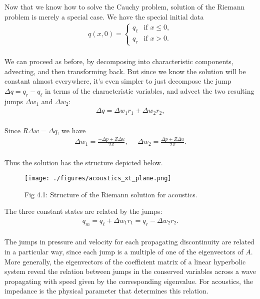 \documentclass{SIAMbook2016}
\makeatletter
\def\maxwidth{\ifdim\Gin@nat@width>\linewidth\linewidth
    \else\Gin@nat@width\fi}
\let\Oldincludegraphics\includegraphics
\renewcommand{\includegraphics}[1]{\Oldincludegraphics[width=.8\maxwidth]{#1}}
\makeatother
\begin{document}
Now that we know how to solve the Cauchy problem, solution of the
Riemann problem is merely a special case. We have the special initial
data\\
\begin{align*}
q(x,0) = \begin{cases}
q_\ell & \text{if   } x \le 0, \\
q_r & \text{if   } x > 0.
\end{cases}
\end{align*}\\
We can proceed as before, by decomposing into characteristic components,
advecting, and then transforming back. But since we know the solution
will be constant almost everywhere, it's even simpler to just decompose
the jump \(\Delta q = q_r - q_\ell\) in terms of the characteristic
variables, and advect the two resulting jumps \(\Delta w_1\) and
\(\Delta w_2\):\\
\begin{align*}
\Delta q = \Delta w_1 r_1 + \Delta w_2 r_2,
\end{align*}\\
Since \(R\Delta w = \Delta q\), we have\\
\begin{align*}
\Delta w_1 = \frac{-\Delta p + Z\Delta u}{2Z}, \ \ \ \ \ \
\Delta w_2 = \frac{\Delta p + Z\Delta u}{2Z}.
\end{align*}\\
Thus the solution has the structure depicted below.

\begin{figure}
\centering
\texttt{[image: ./figures/acoustics\_xt\_plane.png]}
\caption{Fig 4.1: Structure of the Riemann solution for acoustics.}
\end{figure}

The three constant states are related by the jumps:\\
\begin{align}
q_m = q_\ell + \Delta w_1 r_1 = q_r - \Delta w_2 r_2.
\label{eq:acussol}
\end{align}\\
The jumps in pressure and velocity for each propagating discontinuity
are related in a particular way, since each jump is a multiple of one of
the eigenvectors of \(A\). More generally, the eigenvectors of the
coefficient matrix of a linear hyperbolic system reveal the relation
between jumps in the conserved variables across a wave propagating with
speed given by the corresponding eigenvalue. For acoustics, the
impedance is the physical parameter that determines this relation.
\end{document}
